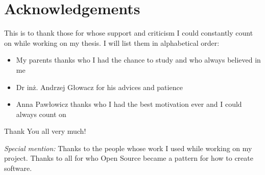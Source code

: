 \chapter{Acknowledgements}
This is to thank those for whose support and criticism I could constantly count on
while working on my thesis. I will list them in alphabetical order:

\begin{itemize}
\item My parents thanks who I had the chance to study and who always believed in me  
\item Dr inż. Andrzej Głowacz for his advices and patience 
\item Anna Pawłowicz thanks who I had the best motivation ever and I could always count on
\end{itemize}

Thank You all very much!

\emph{Special mention:} Thanks to the people whose work I used while working on my project.
Thanks to all for who Open Source became a pattern for how to create software.
